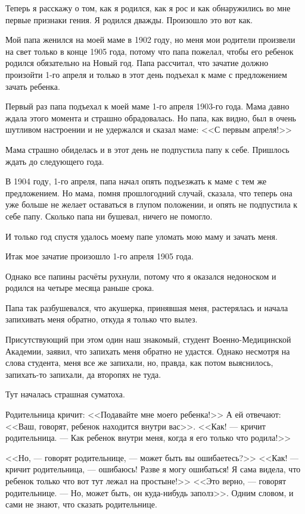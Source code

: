 Теперь я расскажу о том, как я родился, как я рос и как обнаружились во мне первые признаки гения. Я родился дважды. Произошло это вот как.

Мой папа женился на моей маме в 1902 году, но меня мои родители произвели на свет только в конце 1905 года, потому что папа пожелал, чтобы его ребенок родился обязательно на Новый год. Папа рассчитал, что зачатие должно произойти 1-го апреля и только в этот день подъехал к маме с предложением зачать ребенка.

Первый раз папа подъехал к моей маме 1-го апреля 1903-го года. Мама давно ждала этого момента и страшно обрадовалась. Но папа, как видно, был в очень шутливом настроении и не удержался и сказал маме: <<С первым апреля!>>

Мама страшно обиделась и в этот день не подпустила папу к себе. Пришлось ждать до следующего года.

В 1904 году, 1-го апреля, папа начал опять подъезжать к маме с тем же предложением. Но мама, помня прошлогодний случай, сказала, что теперь она уже больше не желает оставаться в глупом положении, и опять не подпустила к себе папу. Сколько папа ни бушевал, ничего не помогло.

И только год спустя удалось моему папе уломать мою маму и зачать меня.

Итак мое зачатие произошло 1-го апреля 1905 года.

Однако все папины расчёты рухнули, потому что я оказался недоноском и родился на четыре месяца раньше срока.

Папа так разбушевался, что акушерка, принявшая меня, растерялась и начала запихивать меня обратно, откуда я только что вылез.

Присутствующий при этом один наш знакомый, студент Военно-Медицинской Академии, заявил, что запихать меня обратно не удастся. Однако несмотря на слова студента, меня все же запихали, но, правда, как потом выяснилось, запихать-то запихали, да второпях не туда.

Тут началась страшная суматоха.

Родительница кричит: <<Подавайте мне моего ребенка!>> А ей отвечают: <<Ваш, говорят, ребенок находится внутри вас>>. <<Как! --- кричит родительница. --- Как ребенок внутри меня, когда я его только что родила!>>

<<Но, --- говорят родительнице, --- может быть вы ошибаетесь?>> <<Как! --- кричит родительница, --- ошибаюсь! Разве я могу ошибаться! Я сама видела, что ребенок только что вот тут лежал на простыне!>> <<Это верно, --- говорят родительнице. --- Но, может быть, он куда-нибудь заполз>>. Одним словом, и сами не знают, что сказать родительнице.


